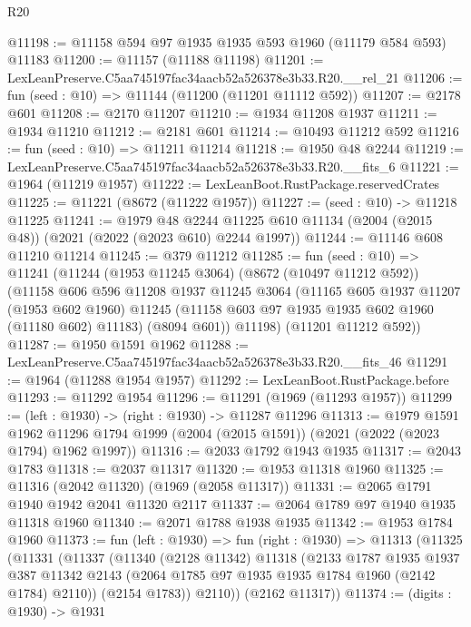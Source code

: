 \begin{lexlean}{R20}
\begin{coremodule}
@11198 := @11158 @594 @97 @1935 @1935 @593 @1960 (@11179 @584 @593) @11183
@11200 := @11157 (@11188 @11198)
@11201 := LexLeanPreserve.C5aa745197fac34aacb52a526378e3b33.R20.__rel_21
@11206 := fun (seed : @10) => @11144 (@11200 (@11201 @11112 @592))
@11207 := @2178 @601
@11208 := @2170 @11207
@11210 := @1934 @11208 @1937
@11211 := @1934 @11210
@11212 := @2181 @601
@11214 := @10493 @11212 @592
@11216 := fun (seed : @10) => @11211 @11214
@11218 := @1950 @48 @2244
@11219 := LexLeanPreserve.C5aa745197fac34aacb52a526378e3b33.R20.__fits_6
@11221 := @1964 (@11219 @1957)
@11222 := LexLeanBoot.RustPackage.reservedCrates
@11225 := @11221 (@8672 (@11222 @1957))
@11227 := (seed : @10) -> @11218 @11225
@11241 := @1979
    @48
    @2244
    @11225
    @610
    @11134
    (@2004 (@2015 @48))
    (@2021 (@2022 (@2023 @610) @2244 @1997))
@11244 := @11146 @608 @11210 @11214
@11245 := @379 @11212
@11285 := fun (seed : @10) =>
  @11241
    (@11244
      (@1953 @11245 @3064)
      (@8672 (@10497 @11212 @592))
      (@11158
        @606
        @596
        @11208
        @1937
        @11245
        @3064
        (@11165
          @605
          @1937
          @11207
          (@1953 @602 @1960)
          @11245
          (@11158 @603 @97 @1935 @1935 @602 @1960 (@11180 @602) @11183)
          (@8094 @601))
        @11198)
      (@11201 @11212 @592))
@11287 := @1950 @1591 @1962
@11288 := LexLeanPreserve.C5aa745197fac34aacb52a526378e3b33.R20.__fits_46
@11291 := @1964 (@11288 @1954 @1957)
@11292 := LexLeanBoot.RustPackage.before
@11293 := @11292 @1954
@11296 := @11291 (@1969 (@11293 @1957))
@11299 := (left : @1930) -> (right : @1930) -> @11287 @11296
@11313 := @1979
    @1591
    @1962
    @11296
    @1794
    @1999
    (@2004 (@2015 @1591))
    (@2021 (@2022 (@2023 @1794) @1962 @1997))
@11316 := @2033 @1792 @1943 @1935
@11317 := @2043 @1783
@11318 := @2037 @11317
@11320 := @1953 @11318 @1960
@11325 := @11316 (@2042 @11320) (@1969 (@2058 @11317))
@11331 := @2065 @1791 @1940 @1942 @2041 @11320 @2117
@11337 := @2064 @1789 @97 @1940 @1935 @11318 @1960
@11340 := @2071 @1788 @1938 @1935
@11342 := @1953 @1784 @1960
@11373 := fun (left : @1930) =>
  fun (right : @1930) =>
  @11313
    (@11325
      (@11331
        (@11337
          (@11340
            (@2128 @11342)
            @11318
            (@2133
              @1787
              @1935
              @1937
              @387
              @11342
              @2143
              (@2064 @1785 @97 @1935 @1935 @1784 @1960 (@2142 @1784) @2110))
            (@2154 @1783))
          @2110))
      (@2162 @11317))
@11374 := (digits : @1930) -> @1931

\end{coremodule}
\end{lexlean}
